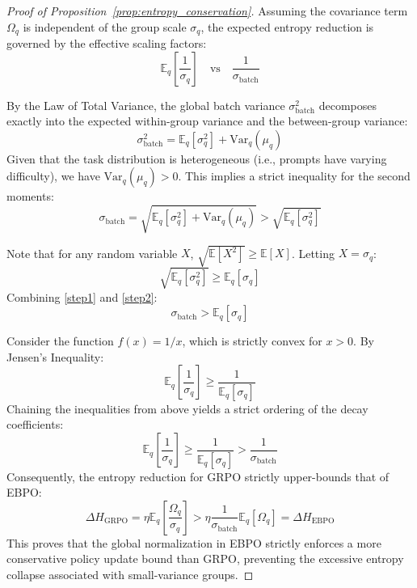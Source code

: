 \documentclass{article}
\theoremstyle{plain}
\theoremstyle{definition}
\theoremstyle{remark}
\begin{document}
\begin{proof}[Proof of Proposition~\ref{prop:entropy_conservation}]
Assuming the covariance term $\Omega_q$ is independent of the group scale $\sigma_q$, the expected entropy reduction is governed by the effective scaling factors:
$$ \mathbb{E}_q \left[ \frac{1}{\sigma_q} \right] \quad \text{vs} \quad \frac{1}{\sigma_{\text{batch}}} $$

By the Law of Total Variance, the global batch variance $\sigma_{\text{batch}}^2$ decomposes exactly into the expected within-group variance and the between-group variance:
\begin{equation}
    \sigma_{\text{batch}}^2 = \mathbb{E}_q[\sigma_q^2] + \text{Var}_q(\mu_q)
\end{equation}
Given that the task distribution is heterogeneous (i.e., prompts have varying difficulty), we have $\text{Var}_q(\mu_q) > 0$. This implies a strict inequality for the second moments:
\begin{equation}
    \sigma_{\text{batch}} = \sqrt{\mathbb{E}_q[\sigma_q^2] + \text{Var}_q(\mu_q)} > \sqrt{\mathbb{E}_q[\sigma_q^2]} \label{step1}
\end{equation}

Note that for any random variable $X$, $\sqrt{\mathbb{E}[X^2]} \geq \mathbb{E}[X]$. Letting $X = \sigma_q$:
\begin{equation}
    \sqrt{\mathbb{E}_q[\sigma_q^2]} \geq \mathbb{E}_q[\sigma_q] \label{step2}
\end{equation}
Combining \eqref{step1} and \eqref{step2}:
\begin{equation*}
    \sigma_{\text{batch}} > \mathbb{E}_q[\sigma_q]
\end{equation*}

Consider the function $f(x) = 1/x$, which is strictly convex for $x > 0$. By Jensen's Inequality:
\begin{equation*}
    \mathbb{E}_q \left[ \frac{1}{\sigma_q} \right] \geq \frac{1}{\mathbb{E}_q[\sigma_q]}
\end{equation*}
Chaining the inequalities from above yields a strict ordering of the decay coefficients:
\begin{equation*}
    \mathbb{E}_q \left[ \frac{1}{\sigma_q} \right] \geq \frac{1}{\mathbb{E}_q[\sigma_q]} > \frac{1}{\sigma_{\text{batch}}}
\end{equation*}
Consequently, the entropy reduction for GRPO strictly upper-bounds that of EBPO:
\begin{equation*}
    \Delta H_{\text{GRPO}} = \eta \mathbb{E}_q \left[ \frac{\Omega_q}{\sigma_q} \right] > \eta \frac{1}{\sigma_{\text{batch}}} \mathbb{E}_q [\Omega_q] = \Delta H_{\text{EBPO}}
\end{equation*}
This proves that the global normalization in EBPO strictly enforces a more conservative policy update bound than GRPO, preventing the excessive entropy collapse associated with small-variance groups.
\end{proof}
\fi
\end{document}
